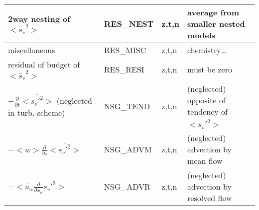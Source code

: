 \begin{longtable}[c]{|p{}|p{}|p{}|p{}|}
{\rm 2way nesting of }$<\tilde{s_v}^2>$                            & RES\_NEST  & z,t,n & average from smaller nested models \\\hline
{\rm miscellaneous}                                                & RES\_MISC  & z,t,n & chemistry\ldots \\\hline
{\rm residual of budget of} $<\tilde{s_v}^2>$                      & RES\_RESI  & z,t,n & must be zero \\\hline
$-\frac{\partial }{\partial t}<\overline{s_v'^2}>$ (neglected in turb. scheme) & NSG\_TEND & z,t,n & (neglected) opposite of tendency of $<\overline{s_v'^2}>$ \\\hline
$-<w>\frac{\partial}{\partial z}<\overline{s_v'^2}>$               & NSG\_ADVM  & z,t,n & (neglected) advection by mean flow\\\hline
$-<\tilde{u_\alpha}\frac{\partial}{\partial x_\alpha}\overline{s_v'^2}>$  & NSG\_ADVR & z,t,n & (neglected) advection by resolved flow\\\hline
\end{longtable}
